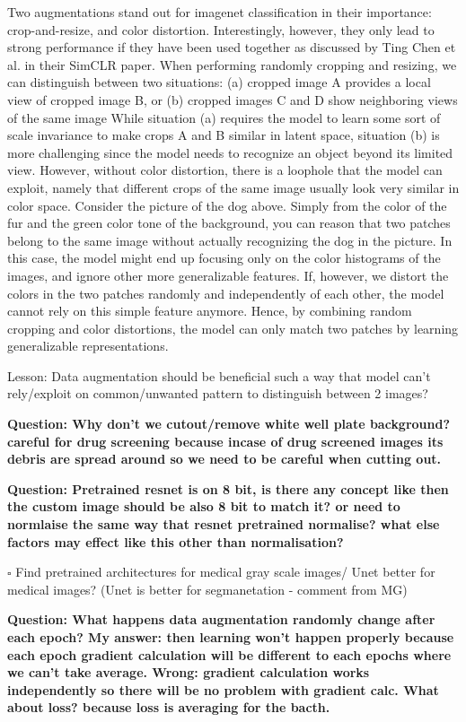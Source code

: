 \documentclass[12pt,twoside,a4paper,parskip]{scrbook} %
\begin{document}
Two augmentations stand out for imagenet classification in their importance: crop-and-resize, and color distortion. Interestingly, however, they only lead to strong performance if they have been used together as discussed by Ting Chen et al. in their SimCLR paper. When performing randomly cropping and resizing, we can distinguish between two situations: (a) cropped image A provides a local view of cropped image B, or (b) cropped images C and D show neighboring views of the same image
While situation (a) requires the model to learn some sort of scale invariance to make crops A and B similar in latent space, situation (b) is more challenging since the model needs to recognize an object beyond its limited view. However, without color distortion, there is a loophole that the model can exploit, namely that different crops of the same image usually look very similar in color space. Consider the picture of the dog above. Simply from the color of the fur and the green color tone of the background, you can reason that two patches belong to the same image without actually recognizing the dog in the picture. In this case, the model might end up focusing only on the color histograms of the images, and ignore other more generalizable features. If, however, we distort the colors in the two patches randomly and independently of each other, the model cannot rely on this simple feature anymore. Hence, by combining random cropping and color distortions, the model can only match two patches by learning generalizable representations.

Lesson: Data augmentation should be beneficial such a way that model can't rely/exploit on common/unwanted pattern to distinguish between 2 images?

\textbf{Question: Why don't we cutout/remove white well plate background? careful for drug screening because incase of drug screened images its debris are spread around so we need to be careful when cutting out.}

\textbf{Question: Pretrained resnet is on 8 bit, is there any concept like then the custom image should be also 8 bit to match it? or need to normlaise the same way that resnet pretrained normalise? what else factors may effect like this other than normalisation? } 

$\square$ Find pretrained architectures for medical gray scale images/ Unet better for medical images? (Unet is better for segmanetation - comment from MG)

\textbf{Question: What happens data augmentation randomly change after each epoch? My answer: then learning won't happen properly because each epoch gradient calculation will be different to each epochs where we can't take average. Wrong: gradient calculation works independently so there will be no problem with gradient calc. What about loss? because loss is averaging for the bacth.} 
\end{document}
